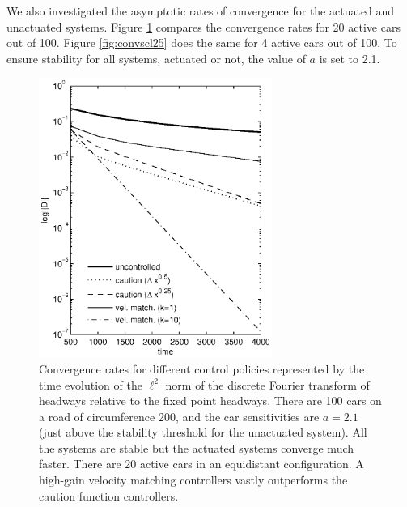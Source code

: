 \documentclass[10pt,twocolumn]{article}
\theoremstyle{ss}
\newcommand{\lm}{\fontfamily{\sfdefault}\selectfont}
\begin{document}
We also investigated the asymptotic rates of convergence for the actuated and unactuated systems. Figure \ref{fig:convscl5} compares the convergence rates for 20 active cars out of 100. Figure \ref{fig:convscl25} does the same for 4 active cars out of 100. To ensure stability for all systems, actuated or not, the value of $a$ is set to 2.1.
\begin{figure}[!h]
\lm
\begin{center}
\includegraphics[width=3in]{convscl5}
\end{center}
\caption{ \label{fig:convscl5} Convergence rates for different control policies represented by the time evolution of the $\ell^2$ norm of the discrete Fourier transform of headways relative to the fixed point headways. There are 100 cars on a road of circumference 200, and the car sensitivities are $a=2.1$ (just above the stability threshold for the unactuated system). All the systems are stable but the actuated systems converge much faster. There are 20 active cars in an equidistant configuration. A high-gain velocity matching controllers vastly outperforms the caution function controllers.}
\end{figure}
\end{document}
